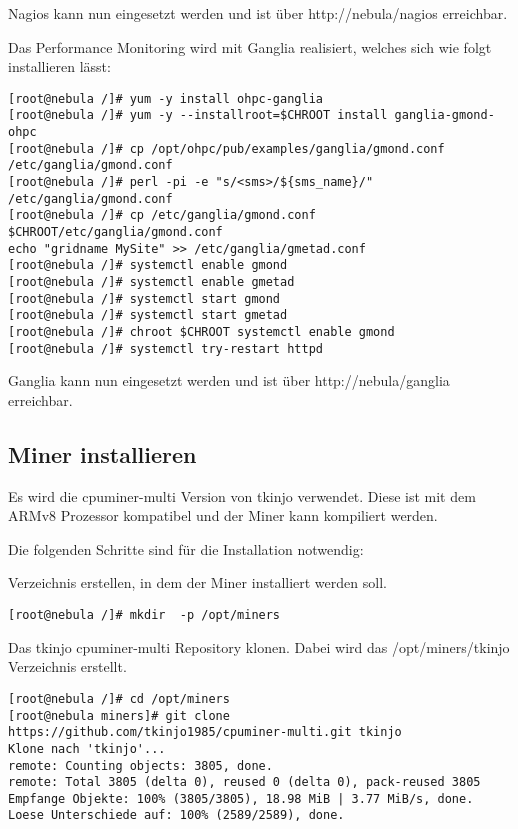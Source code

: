 Nagios kann nun eingesetzt werden und ist über http://nebula/nagios erreichbar.

Das Performance Monitoring wird mit Ganglia realisiert, welches sich wie folgt installieren lässt:

\begin{lstlisting}
[root@nebula /]# yum -y install ohpc-ganglia
[root@nebula /]# yum -y --installroot=$CHROOT install ganglia-gmond-ohpc
[root@nebula /]# cp /opt/ohpc/pub/examples/ganglia/gmond.conf /etc/ganglia/gmond.conf
[root@nebula /]# perl -pi -e "s/<sms>/${sms_name}/" /etc/ganglia/gmond.conf
[root@nebula /]# cp /etc/ganglia/gmond.conf $CHROOT/etc/ganglia/gmond.conf
echo "gridname MySite" >> /etc/ganglia/gmetad.conf
[root@nebula /]# systemctl enable gmond
[root@nebula /]# systemctl enable gmetad
[root@nebula /]# systemctl start gmond
[root@nebula /]# systemctl start gmetad
[root@nebula /]# chroot $CHROOT systemctl enable gmond
[root@nebula /]# systemctl try-restart httpd
\end{lstlisting}

Ganglia kann nun eingesetzt werden und ist über http://nebula/ganglia erreichbar.

\subsection{Miner installieren}
Es wird die cpuminer-multi Version von tkinjo verwendet. Diese ist mit dem ARMv8 Prozessor kompatibel und der Miner kann kompiliert werden.

Die folgenden Schritte sind für die Installation notwendig:

Verzeichnis erstellen, in dem der Miner installiert werden soll.
\begin{lstlisting}
[root@nebula /]# mkdir  -p /opt/miners
\end{lstlisting}

Das tkinjo cpuminer-multi Repository klonen. Dabei wird das /opt/miners/tkinjo Verzeichnis erstellt.
\begin{lstlisting}
[root@nebula /]# cd /opt/miners
[root@nebula miners]# git clone https://github.com/tkinjo1985/cpuminer-multi.git tkinjo
Klone nach 'tkinjo'...
remote: Counting objects: 3805, done.
remote: Total 3805 (delta 0), reused 0 (delta 0), pack-reused 3805
Empfange Objekte: 100% (3805/3805), 18.98 MiB | 3.77 MiB/s, done.
Loese Unterschiede auf: 100% (2589/2589), done.
\end{lstlisting}

